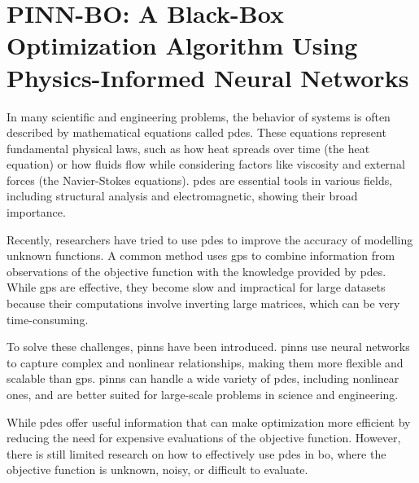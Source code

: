 \chapter[Black-Box Optimization Algorithm Using Physics-Informed
Neural Networks]{PINN-BO: A Black-Box Optimization Algorithm Using Physics-Informed
Neural Networks} %
\label{chap:pinn-bo}

In many scientific and engineering problems, the behavior of systems is often described by mathematical equations called \acfp{pde}. These equations represent fundamental physical laws, such as how heat spreads over time (the heat equation) or how fluids flow while considering factors like viscosity and external forces (the Navier-Stokes equations). \acp{pde} are essential tools in various fields, including structural analysis and electromagnetic, showing their broad importance.

Recently, researchers have tried to use \acp{pde} to improve the accuracy of modelling unknown functions. A common method uses \acp{gp} to combine information from observations of the objective function with the knowledge provided by \acp{pde}. While \acp{gp} are effective, they become slow and impractical for large datasets because their computations involve inverting large matrices, which can be very time-consuming.

To solve these challenges, \acfp{pinn} have been introduced. \acp{pinn} use neural networks to capture complex and nonlinear relationships, making them more flexible and scalable than \acp{gp}. \acp{pinn} can handle a wide variety of \acp{pde}, including nonlinear ones, and are better suited for large-scale problems in science and engineering.

While \acp{pde} offer useful information that can make optimization more efficient by reducing the need for expensive evaluations of the objective function. However, there is still limited research on how to effectively use \acp{pde} in \ac{bo}, where the objective function is unknown, noisy, or difficult to evaluate.

